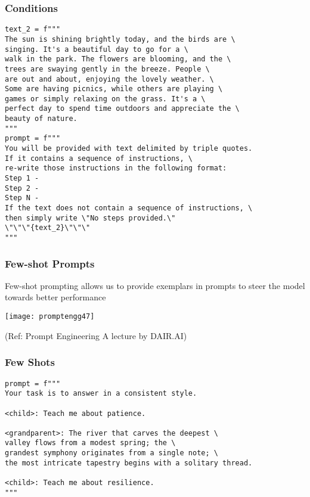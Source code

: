 \begin{frame}[fragile]\frametitle{Conditions}

{\tiny 
\begin{lstlisting}
text_2 = f"""
The sun is shining brightly today, and the birds are \
singing. It's a beautiful day to go for a \ 
walk in the park. The flowers are blooming, and the \ 
trees are swaying gently in the breeze. People \ 
are out and about, enjoying the lovely weather. \ 
Some are having picnics, while others are playing \ 
games or simply relaxing on the grass. It's a \ 
perfect day to spend time outdoors and appreciate the \ 
beauty of nature.
"""
prompt = f"""
You will be provided with text delimited by triple quotes. 
If it contains a sequence of instructions, \ 
re-write those instructions in the following format:
Step 1 - 
Step 2 -
Step N -
If the text does not contain a sequence of instructions, \ 
then simply write \"No steps provided.\"
\"\"\"{text_2}\"\"\"
"""
\end{lstlisting}
}
		
\end{frame}

\begin{frame}[fragile]\frametitle{Few-shot Prompts}

Few-shot prompting allows us to provide exemplars in 
prompts to steer the model towards better performance


\begin{center}
\texttt{[image: promptengg47]}

{\tiny (Ref: Prompt Engineering A lecture by DAIR.AI)}

\end{center}
\end{frame}


\begin{frame}[fragile]\frametitle{Few Shots}


\begin{lstlisting}
prompt = f"""
Your task is to answer in a consistent style.

<child>: Teach me about patience.

<grandparent>: The river that carves the deepest \ 
valley flows from a modest spring; the \ 
grandest symphony originates from a single note; \ 
the most intricate tapestry begins with a solitary thread.

<child>: Teach me about resilience.
"""
\end{lstlisting}
		
		
\end{frame}

